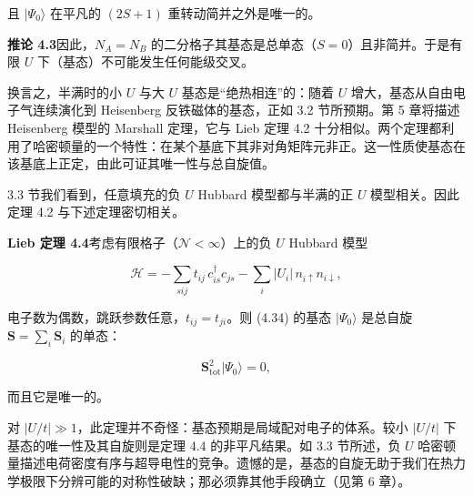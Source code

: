 且 $|\Psi_0\rangle$ 在平凡的 $(2S + 1)$ 重转动简并之外是唯一的。
\medskip

\medskip
\noindent\textbf{推论 4.3}\quad 因此，$N_{A} = N_{B}$ 的二分格子其基态是总单态（$S = 0$）且非简并。于是有限 $U$ 下（基态）不可能发生任何能级交叉。
\medskip

换言之，半满时的小 $U$ 与大 $U$ 基态是“绝热相连”的：随着 $U$ 增大，基态从自由电子气连续演化到 Heisenberg 反铁磁体的基态，正如 3.2 节所预期。第 5 章将描述 Heisenberg 模型的 Marshall 定理，它与 Lieb 定理 4.2 十分相似。两个定理都利用了哈密顿量的一个特性：在某个基底下其非对角矩阵元非正。这一性质使基态在该基底上正定，由此可证其唯一性与总自旋值。

3.3 节我们看到，任意填充的负 $U$ Hubbard 模型都与半满的正 $U$ 模型相关。因此定理 4.2 与下述定理密切相关。

\medskip
\noindent\textbf{Lieb 定理 4.4}\quad 考虑有限格子（$\mathcal{N} < \infty$）上的负 $U$ Hubbard 模型

\begin{equation*}
\mathcal {H} = - \sum_ {sij} t _ {ij} \, c _ {is} ^ {\dagger} c _ {js} - \sum_ {i} | U _ {i} | \, n _ {i \uparrow} n _ {i \downarrow},
\tag{4.34}
\end{equation*}

电子数为偶数，跳跃参数任意，$t_{ij} = t_{ji}$。则 (4.34) 的基态 $|\Psi_0\rangle$ 是总自旋 $\mathbf{S} = \sum_i\mathbf{S}_i$ 的单态：

\begin{equation*}
\mathbf {S} _ {\mathrm{tot}} ^ {2} | \Psi_ {0} \rangle = 0,
\tag{4.35}
\end{equation*}

而且它是唯一的。
\medskip

对 $|U/t| \gg 1$，此定理并不奇怪：基态预期是局域配对电子的体系。较小 $|U/t|$ 下基态的唯一性及其自旋则是定理 4.4 的非平凡结果。如 3.3 节所述，负 $U$ 哈密顿量描述电荷密度有序与超导电性的竞争。遗憾的是，基态的自旋无助于我们在热力学极限下分辨可能的对称性破缺；那必须靠其他手段确立（见第 6 章）。

